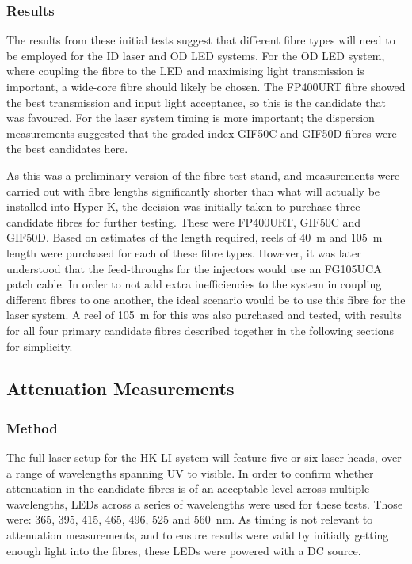 \documentclass[a4paper,11pt]{article}
\begin{document}
\subsubsection{Results}

The results from these initial tests suggest that different fibre types will need to be employed for the ID laser and OD LED systems. For the OD LED system, where coupling the fibre to the LED and maximising light transmission is important, a wide-core fibre should likely be chosen. The FP400URT fibre showed the best transmission and input light acceptance, so this is the candidate that was favoured. For the laser system timing is more important; the dispersion measurements suggested that the graded-index GIF50C and GIF50D fibres were the best candidates here.

As this was a preliminary version of the fibre test stand, and measurements were carried out with fibre lengths significantly shorter than what will actually be installed into Hyper-K, the decision was initially taken to purchase three candidate fibres for further testing. These were FP400URT, GIF50C and GIF50D. Based on estimates of the length required, reels of 40~m and 105~m length were purchased for each of these fibre types. However, it was later understood that the feed-throughs for the injectors would use an FG105UCA patch cable. In order to not add extra inefficiencies to the system in coupling different fibres to one another, the ideal scenario would be to use this fibre for the laser system. A reel of 105~m for this was also purchased and tested, with results for all four primary candidate fibres described together in the following sections for simplicity.


\subsection{Attenuation Measurements}

\subsubsection{Method}\label{sec:fibre:sub:att:sub:method}

The full laser setup for the HK LI system will feature five or six laser heads, over a range of wavelengths spanning UV to visible. In order to confirm whether attenuation in the candidate fibres is of an acceptable level across multiple wavelengths, LEDs across a series of wavelengths were used for these tests. Those were: 365, 395, 415, 465, 496, 525 and 560~nm. As timing is not relevant to attenuation measurements, and to ensure results were valid by initially getting enough light into the fibres, these LEDs were powered with a DC source.
\end{document}
